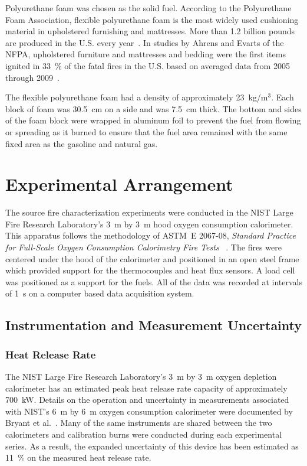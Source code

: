 \documentclass[twoside]{uocthesis}
\begin{document}
{Polyurethane foam was chosen as the solid fuel.  According to the Polyurethane Foam Association, flexible polyurethane foam is the most widely used cushioning material in upholstered furnishing and mattresses. More than 1.2 billion pounds are produced in the U.S. every year~\cite{Foam,Touch}. In studies by Ahrens and Evarts of the NFPA, upholstered furniture and mattresses and bedding were the first items ignited in 33~\% of the fatal fires in the U.S. based on averaged data from 2005 through 2009~\cite{Ahrens:2011,Evarts:2011}.

The flexible polyurethane foam had a density of approximately 23~kg/m$^3$.  Each block of foam was 30.5~cm on a side and was 7.5~cm thick. The bottom and sides of the foam block were wrapped in aluminum foil to prevent the fuel from flowing or spreading as it burned to ensure that the fuel area remained with the same fixed area as the gasoline and natural gas.

\section{Experimental Arrangement}

The source fire characterization experiments were conducted in the NIST Large Fire Research Laboratory’s 3~m by 3~m hood oxygen consumption calorimeter. This apparatus follows the methodology of ASTM~E 2067-08, {\em Standard Practice for Full-Scale Oxygen Consumption Calorimetry Fire Tests} ~\cite{ASTM_E2067}. The fires were centered under the hood of the calorimeter and positioned in an open steel frame which provided support for the thermocouples and heat flux sensors. A load cell was positioned as a support for the fuels.  All of the data was recorded at intervals of 1~s on a computer based data acquisition system.

\subsection{Instrumentation and Measurement Uncertainty}

\subsubsection{Heat Release Rate}

The NIST Large Fire Research Laboratory’s 3~m by 3~m oxygen depletion calorimeter has an estimated peak heat release rate capacity of approximately 700~kW.  Details on the operation and uncertainty in measurements associated with NIST’s 6~m by 6~m oxygen consumption calorimeter were documented by Bryant et al.~\cite{Bryant:2004}. Many of the same instruments are shared between the two calorimeters and calibration burns were conducted during each experimental series.  As a result, the expanded uncertainty of this device has been estimated as 11~\% on the measured heat release rate.

}
\end{document}
